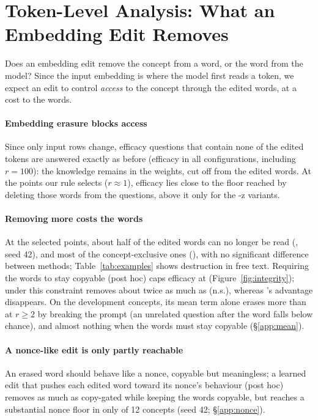 \section{Token-Level Analysis: What an Embedding Edit Removes}
\label{sec:token}

Does an embedding edit remove the concept from a word, or the word from the model?
Since the input embedding is where the model first reads a token, we expect an edit to control \emph{access} to the concept through the edited words, at a cost to the words.

\paragraph{Embedding erasure blocks access}
Since only input rows change, efficacy questions that contain none of the edited tokens are answered exactly as before (efficacy  in all  configurations, including $r = 100$): the knowledge remains in the weights, cut off from the edited words.
At the points our rule selects ($r \approx 1$), efficacy lies close to the floor reached by deleting those words from the questions, above it only for the -z variants.

\paragraph{Removing more costs the words}
At the selected points, about half of the edited words can no longer be read (, seed 42), and most of the concept-exclusive ones (), with no significant difference between methods; Table~\ref{tab:examples} shows destruction in free text.
Requiring the words to stay copyable (post hoc) caps efficacy at  (Figure~\ref{fig:integrity}); under this constraint \cinder{} removes about twice as much as \ember{} (n.s.), whereas \cinderz{}'s advantage disappears.
On the development concepts, its mean term alone erases more than \cinderz{} at $r \geq 2$ by breaking the prompt (an unrelated question after the word falls below chance), and almost nothing when the words must stay copyable (\S\ref{app:mean}).

\paragraph{A nonce-like edit is only partly reachable}
An erased word should behave like a nonce, copyable but meaningless; a learned edit that pushes each edited word toward its nonce's behaviour (post hoc) removes  as much as copy-gated \ember{} while keeping the words copyable, but reaches a substantial nonce floor in only  of 12 concepts (seed 42; \S\ref{app:nonce}).

